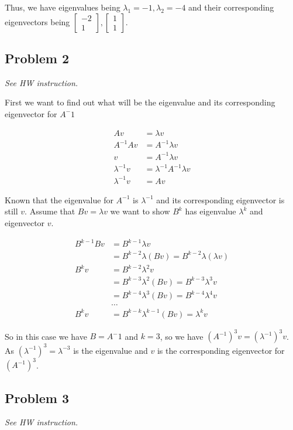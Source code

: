 \documentclass[11pt]{article}
\providecommand{\qbm}[1]{\begin{bmatrix} #1 \end{bmatrix}}
\begin{document}
Thus, we have eigenvalues being $\lambda_1 = -1, \lambda_2 = -4$ and their corresponding eigenvectors being $\qbm{-2 \\ 1}, \qbm{1 \\ 1}$.

\subsection*{Problem 2}
\textit{See HW instruction.}\newline


First we want to find out what will be the eigenvalue and its corresponding eigenvector for $A^-1$

\begin{align*}
    Av &= \lambda v \\
    A^{-1} Av &= A^{-1} \lambda v \\
    v &= A^{-1} \lambda v \\
    \lambda^{-1} v &= \lambda^{-1} A^{-1} \lambda v \\
    \lambda^{-1} v &= Av
\end{align*}

Known that the eigenvalue for $A^{-1}$ is $\lambda^{-1}$ and its corresponding eigenvector is still $v$. Assume that $Bv = \lambda v$ we want to show $B^k$ has eigenvalue $\lambda^k$ and eigenvector $v$.

\begin{align*}
    B^{k-1} Bv &= B^{k-1} \lambda v \\
    &= B^{k-2} \lambda (Bv) = B^{k-2} \lambda (\lambda v) \\
    B^k v &= B^{k-2} \lambda^2 v \\
    &= B^{k-3} \lambda^2 (Bv) = B^{k-3} \lambda^3 v \\
    &= B^{k-4} \lambda^3 (Bv) = B^{k-4} \lambda^4 v \\
    &\dots \\
    B^k v &= B^{k-k} \lambda^{k-1} (Bv) = \lambda^k v
\end{align*}

So in this case we have $B = A^-1$ and $k = 3$, so we have $(A^{-1})^3 v = (\lambda^{-1})^3 v$. As $(\lambda^{-1})^3 = \lambda^{-3}$ is the eigenvalue and $v$ is the corresponding eigenvector for $(A^{-1})^3$.


\subsection*{Problem 3}
\textit{See HW instruction.}\newline
\end{document}
